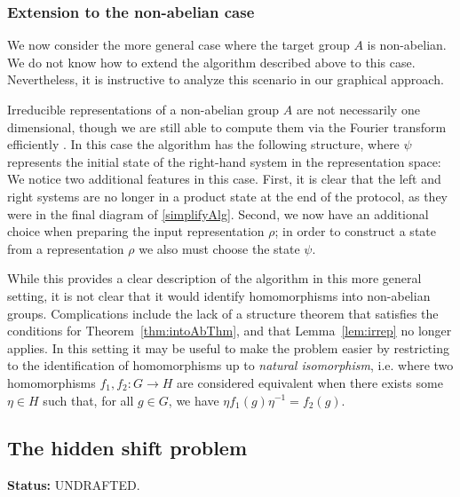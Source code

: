 \subsubsection*{Extension to the non-abelian case}
We now consider the more general case where the target group $A$ is non-abelian. We do not know how to extend the algorithm described above to this case.  Nevertheless, it is instructive to analyze this scenario in our graphical approach. 

Irreducible representations of a non-abelian group $A$ are not necessarily one dimensional, though we are still able to compute them via the Fourier transform efficiently \cite{childs2010quantum}. In this case the algorithm has the following structure, where $\psi$ represents the initial state of the right-hand system in the representation space:
\begin{equation}
\label{eq:NonAbAlg}

\end{equation}
We notice two additional features in this case. First, it is clear that the left and right systems are no longer in a product state at the end of the protocol, as they were in the final diagram of \eqref{simplifyAlg}. Second, we now have an additional choice when preparing the input representation $\rho$; in order to construct a state from a representation $\rho$ we also must choose the state $\psi$.

While this provides a clear description of the algorithm in this more general setting, it is not clear that it would identify homomorphisms into non-abelian groups. Complications include the lack of a structure theorem that satisfies the conditions for Theorem~\ref{thm:intoAbThm}, and that Lemma~\ref{lem:irrep} no longer applies.  In this setting it may be useful to make the problem easier by restricting to the identification of homomorphisms up to \emph{natural isomorphism}, i.e. where two homomorphisms $f_1,f_2:G\to H$ are considered equivalent when there exists some $\eta\in H$ such that, for all $g\in G$, we have $\eta f_1(g) \eta^{-1} = f_2(g)$.

\subsection{\color{blue} The hidden shift problem}
{\bf Status:} UNDRAFTED.
